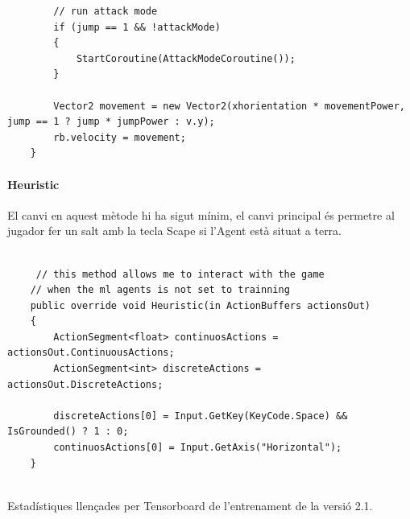 \documentclass{article}
\begin{document}
\begin{lstlisting}
        // run attack mode
        if (jump == 1 && !attackMode)
        {
            StartCoroutine(AttackModeCoroutine());
        }

        Vector2 movement = new Vector2(xhorientation * movementPower, jump == 1 ? jump * jumpPower : v.y);
        rb.velocity = movement;
    }

    \end{lstlisting}
    
    \paragraph{Heuristic}
    El canvi en aquest mètode hi ha sigut mínim, el canvi principal és permetre al jugador fer un salt amb la tecla Scape si l'Agent està situat a terra.
    
    \begin{lstlisting}
      
     // this method allows me to interact with the game
    // when the ml agents is not set to trainning
    public override void Heuristic(in ActionBuffers actionsOut)
    {
        ActionSegment<float> continuosActions = actionsOut.ContinuousActions;
        ActionSegment<int> discreteActions = actionsOut.DiscreteActions;

        discreteActions[0] = Input.GetKey(KeyCode.Space) && IsGrounded() ? 1 : 0;
        continuosActions[0] = Input.GetAxis("Horizontal");
    }
    
    \end{lstlisting}
  
    Estadístiques llençades per Tensorboard de l'entrenament de la versió 2.1.
    
\end{document}
